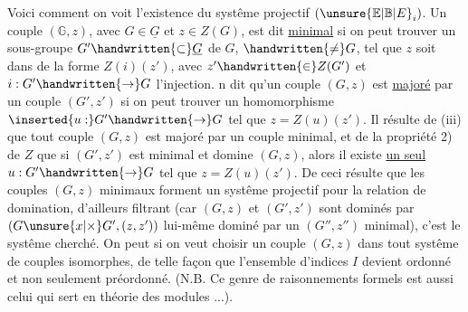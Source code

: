 

Voici comment on voit l'existence du systême projectif $(\unsure{\mathbb{E}|\mathbb{B}|E}_i)$. Un couple $(\mathbb{G},z)$, avec $G\in\underline{G}$ et $z\in Z(G)$, est dit \uline{minimal} si on  peut trouver un sous-groupe $G'\handwritten{\subset}\underline{G}$ de $G$,  $\handwritten{\ne}G$, tel que $z$ soit dans de la forme $Z(i)(z')$, avec $z'\handwritten{\in}Z(G')$ et $i:G'\handwritten{\to}G$ l'injection.  n dit qu'un couple $(G,z)$ est \uline{majoré} par un couple $(G',z')$ si on peut trouver un homomorphisme $\inserted{u:}G'\handwritten{\to}G$ tel que $z=Z(u)(z')$. Il résulte de (iii) que tout couple $(G,z)$ est majoré par un couple minimal, et de la propriété 2) de $Z$ que si $(G',z')$ est minimal et domine $(G,z)$, alors il existe \uline{un seul} $u:G'\handwritten{\to}G$ tel que $z=Z(u)(z')$. De ceci résulte que les couples $(G,z)$ minimaux forment un systême projectif pour la relation de domination, d'ailleurs filtrant (car $(G,z)$ et $(G',z')$ sont dominés par $(G\unsure{x|\times}G',(z,z'))$ lui-même dominé par un $(G'',z'')$ minimal), c'est le systême cherché. On peut si on veut choisir un couple $(G,z)$ dans tout systême de couples  isomorphes, de  telle façon que l'ensemble d'indices  $I$ devient ordonné et non seulement préordonné. (N.B. Ce genre de raisonnements formels est aussi celui qui sert en théorie des  modules ...).

